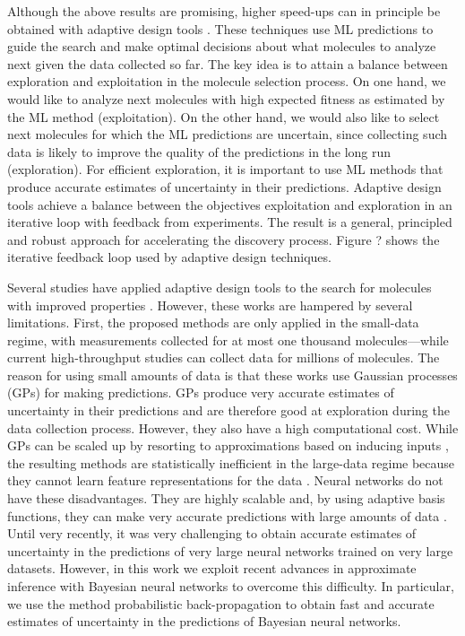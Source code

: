 Although the above results are promising, higher speed-ups can in principle be
obtained with adaptive design tools \cite{jones1998efficient}. These techniques
use ML predictions to guide the search and make optimal decisions about what
molecules to analyze next given the data collected so far. The key idea is to
attain a balance between exploration and exploitation in the molecule selection
process. On one hand, we would like to analyze next molecules with high
expected fitness as estimated by the ML method (exploitation). On the other
hand, we would also like to select next molecules for which the ML predictions
are uncertain, since collecting such data is likely to improve the quality of
the predictions in the long run (exploration). For efficient
exploration, it is important to use ML methods that produce accurate
estimates of uncertainty in their predictions. 
Adaptive design tools achieve a balance
between the objectives exploitation and exploration in an iterative loop with
feedback from experiments. 
The result is a general, principled and robust
approach for accelerating the discovery process. 
Figure ? shows the iterative
feedback loop used by adaptive design techniques.

Several studies have applied adaptive design tools to the search for
molecules with improved properties \cite{Xue_2016,Negoescu_2011,De_Grave_2008}. However, these
works are hampered by several limitations. First, the proposed methods are only
applied in the small-data regime, with measurements collected for at most one
thousand molecules---while current high-throughput studies can collect data for
millions of molecules. The reason for using small amounts of data is that these works
use Gaussian processes (GPs) \cite{rasmussen2006gaussian} for making predictions. GPs
produce very accurate estimates of uncertainty in their predictions and are therefore 
good at exploration during the data collection process.
However, they also have a high computational
cost. While GPs can be scaled up by resorting to approximations based on inducing inputs 
\cite{snelson2005sparse,hensman2015scalable}, the resulting methods are
statistically inefficient in the large-data regime because they cannot learn
feature representations for the data \cite{bengio2007scaling}.
Neural networks do not have these disadvantages. They are highly scalable and,
by using adaptive basis functions, they can make very accurate predictions with
large amounts of data \cite{lecun2015deep}. Until very recently, it was very
challenging to obtain accurate estimates of uncertainty in the predictions of very large
neural networks trained on very large datasets. However, in this work we exploit
recent advances in approximate inference with Bayesian neural networks to overcome this difficulty. 
In particular, we use the method probabilistic back-propagation \cite{Hernandez-Lobato15b} to obtain fast
and accurate estimates of uncertainty in the predictions of Bayesian neural networks.

